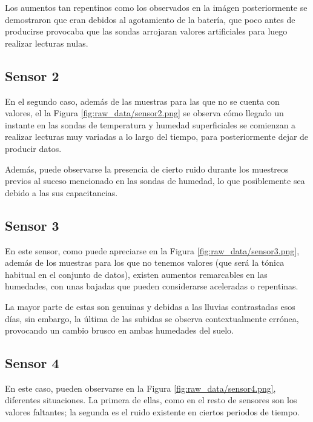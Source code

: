 Los aumentos tan repentinos como los observados en la imágen posteriormente se demostraron
que eran debidos al agotamiento de la batería, que poco antes
de producirse provocaba que las sondas arrojaran valores artificiales para luego realizar lecturas nulas.

\subsection{Sensor 2}


En el segundo caso, además de las muestras para las que no se cuenta con valores,
el la Figura \ref{fig:raw_data/sensor2.png} se observa cómo llegado un instante en
las sondas de temperatura y humedad superficiales se comienzan a realizar lecturas
muy variadas a lo largo del tiempo, para posteriormente dejar de producir datos.

Además, puede observarse la presencia de cierto ruido durante los muestreos previos
al suceso mencionado en las sondas de humedad, lo que posiblemente sea debido a 
las sus capacitancias.

\newpage
\subsection{Sensor 3}


En este sensor, como puede apreciarse en la Figura \ref{fig:raw_data/sensor3.png},
además de los muestras para los que no tenemos valores (que será la tónica habitual
en el conjunto de datos), existen aumentos remarcables en las humedades, con unas
bajadas que pueden considerarse aceleradas o repentinas.

La mayor parte de estas son genuinas y debidas a las lluvias contrastadas esos días, sin 
embargo, la última de las subidas se observa contextualmente errónea, provocando 
un cambio brusco en ambas humedades del suelo.

\newpage
\subsection{Sensor 4}


En este caso, pueden observarse en la Figura \ref{fig:raw_data/sensor4.png}, diferentes
situaciones. La primera de ellas, como en el resto de sensores son los valores faltantes; la
segunda es el ruido existente en ciertos periodos de tiempo.

